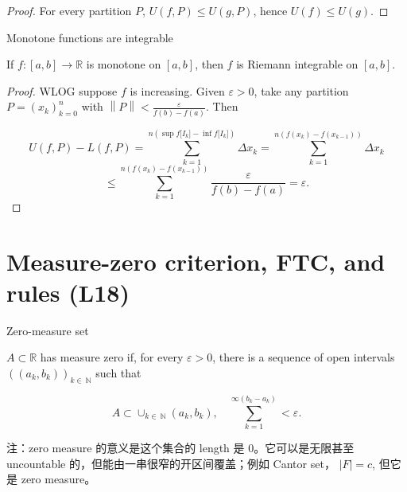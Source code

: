 \begin{proof}

For every partition \(P\), \(U\left( {f,P} \right) \leq U\left( {g,P} \right)\), hence \(U(f) \leq U(g)\).

\end{proof}

\begin{theorem}{Monotone functions are integrable}

If \(f:\left\lbrack {a,b} \right\rbrack\rightarrow\mathbb{R}\) is monotone on \(\left\lbrack {a,b} \right\rbrack\), then \(f\) is Riemann integrable on \(\left\lbrack {a,b} \right\rbrack\).

\end{theorem}

\begin{proof}

WLOG suppose \(f\) is increasing. Given \(\varepsilon > 0\), take any partition \(P = \left( x_{k} \right)_{k = 0}^{n}\) with \(\left\| P \right\| < \frac{\varepsilon}{f(b) - f(a)}\). Then

\[U\left( {f,P} \right) - L\left( {f,P} \right) = \sum\limits_{k = 1}^{n{({\sup f{\lbrack I_{k}\rbrack} - \inf f{\lbrack I_{k}\rbrack}})}}\Delta x_{k} = \sum\limits_{k = 1}^{n{({f{(x_{k})} - f{(x_{k - 1})}})}}\Delta x_{k}\]\[\leq \sum\limits_{k = 1}^{n{({f{(x_{k})} - f{(x_{k - 1})}})}}\frac{\varepsilon}{f(b) - f(a)} = \varepsilon.\]

\end{proof}

\section{Measure-zero criterion, FTC, and rules (L18)}

\begin{definition}{Zero-measure set}

\(A \subset \mathbb{R}\) has measure zero if, for every \(\varepsilon > 0\), there is a sequence of open intervals \(\left( \left( {a_{k},b_{k}} \right) \right)_{k \in \ \mathbb{N}}\) such that

\[A \subset \cup_{k \in \ \mathbb{N}}\left( {a_{k},b_{k}} \right),\quad\sum\limits_{k = 1}^{\infty{({b_{k} - a_{k}})}} < \varepsilon.\]

注：zero measure 的意义是这个集合的 length 是 \(0\)。它可以是无限甚至 uncountable 的，但能由一串很窄的开区间覆盖；例如 Cantor set， \(|F| = c\), 但它是 zero measure。

\end{definition}

